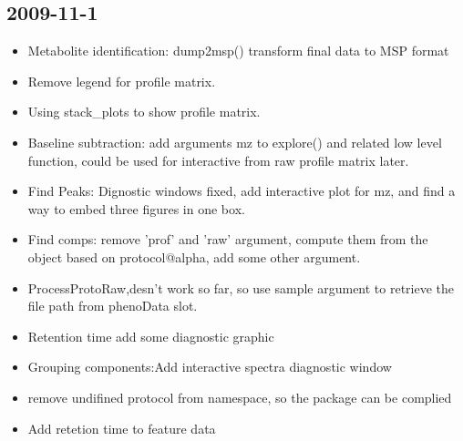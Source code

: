 \documentclass[11pt,a4paper]{article}
\begin{document}
\subsection{2009-11-1}

\begin{itemize}
\item {Metabolite identification: dump2msp() transform final data to MSP format}
\item{ Remove legend for profile matrix.}
\item{ Using stack\_plots to show profile matrix.}
\item{ Baseline subtraction: add arguments mz to explore() and related low level function, could be used for 
interactive from raw profile matrix later.}
\item{ Find Peaks: Dignostic windows fixed, add interactive plot for 
mz, and find a way to embed three figures in one box.}
\item{ Find comps: remove 'prof' and 'raw' argument, compute them from the object based on
protocol@alpha, add some other argument.}
\item{ ProcessProtoRaw,desn't work so far, so use sample argument to retrieve the file
path from phenoData slot.}
\item {Retention time add some diagnostic graphic}
\item {Grouping components:Add interactive spectra diagnostic window}
\item {remove undifined protocol from namespace, so the package can be complied}
\item {Add retetion time to feature data}



\end{itemize}
\end{document}
